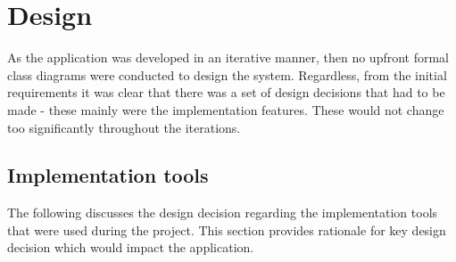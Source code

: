 \chapter{Design}







As the application was developed in an iterative manner, then no upfront formal class diagrams were conducted to design the system. Regardless, from the initial requirements it was clear that there was a set of design decisions that had to be made - these mainly were the implementation features. These would not change too significantly throughout the iterations.

\section{Implementation tools}
The following discusses the design decision regarding the implementation tools that were used during the project. This section provides rationale for key design decision which would impact the application.
